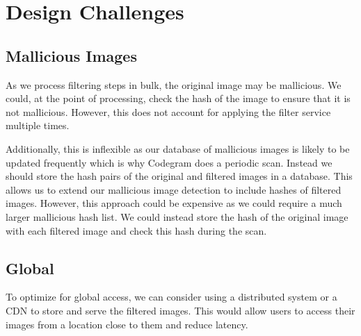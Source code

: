 \documentclass{csse4400}
\begin{document}
\section{Design Challenges}

\subsection{Mallicious Images}
As we process filtering steps in bulk,
the original image may be mallicious.
We could, at the point of processing,
check the hash of the image to ensure that it is not mallicious.
However, this does not account for applying the filter service multiple times.

Additionally, this is inflexible as our database of mallicious images is likely to be updated frequently which is why Codegram does a periodic scan.
Instead we should store the hash pairs of the original and filtered images in a database.
This allows us to extend our mallicious image detection to include hashes of filtered images.
However, this approach could be expensive as we could require a much larger mallicious hash list.
We could instead store the hash of the original image with each filtered image and check this hash during the scan.

\subsection{Global}
To optimize for global access,
we can consider using a distributed system or a CDN to store and serve the filtered images.
This would allow users to access their images from a location close to them and reduce latency.
\end{document}
